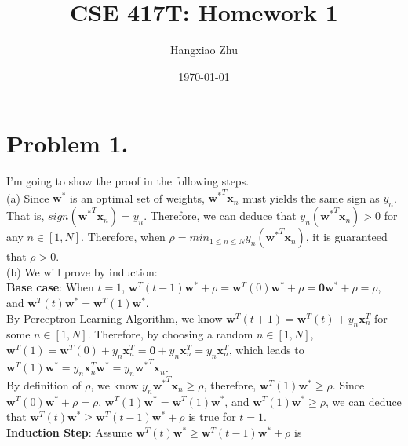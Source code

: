 \documentclass{article}
\begin{document}
    \onehalfspacing

    \begin{singlespace}
        \title{CSE 417T: Homework 1} 
        \author{Hangxiao Zhu}
        \date{\today}
        \maketitle
    \end{singlespace}

    \section*{Problem 1.}
    I'm going to show the proof in the following steps.\\
    (a) Since $\mathbf{w^*}$ is an optimal set of weights, $\mathbf{w^*}^T \mathbf{x}_n$ must yields the same
    sign as $y_n$. That is, $sign(\mathbf{w^*}^T \mathbf{x}_n) = y_n$. Therefore, we can deduce that 
    $y_n(\mathbf{w^*}^T \mathbf{x}_n) > 0$ for any $n \in [1, N]$. Therefore, when 
    $\rho = min_{1 \leq n \leq N}y_n(\mathbf{w^*}^T \mathbf{x}_n)$, it is guaranteed that $\rho > 0$.\\
    (b) We will prove by induction:\\
    \textbf{Base case}: When $t = 1$, $\mathbf{w}^T(t-1)\mathbf{w^*} + \rho = 
    \mathbf{w}^T(0)\mathbf{w^*} + \rho = \mathbf{0}\mathbf{w^*} + \rho = \rho$, and 
    $\mathbf{w}^T(t) \mathbf{w^*} = \mathbf{w}^T(1)\mathbf{w^*}$.\\
    By Perceptron Learning Algorithm, we know 
    $\mathbf{w}^T(t+1) = \mathbf{w}^T(t) + y_n\mathbf{x}_n^T$ for some $n \in [1, N]$.
    Therefore, by choosing a random $n \in [1, N]$, $\mathbf{w}^T(1) = \mathbf{w}^T(0) + y_n\mathbf{x}_n^T = 
    \mathbf{0} + y_n\mathbf{x}_n^T = y_n\mathbf{x}_n^T$, which leads to 
    $\mathbf{w}^T(1)\mathbf{w^*} = y_n\mathbf{x}_n^T \mathbf{w^*} = 
    y_n\mathbf{w^*}^T \mathbf{x}_n$.\\
    By definition of $\rho$, we know $y_n\mathbf{w^*}^T \mathbf{x}_n \geq \rho$, therefore, 
    $\mathbf{w}^T(1)\mathbf{w^*} \geq \rho$.
    Since $\mathbf{w}^T(0)\mathbf{w^*} + \rho = \rho$,
    $\mathbf{w}^T(1) \mathbf{w^*} = \mathbf{w}^T(1)\mathbf{w^*}$, and $\mathbf{w}^T(1)\mathbf{w^*} \geq \rho$,
    we can deduce that $\mathbf{w}^T(t)\mathbf{w^*} \geq \mathbf{w}^T(t-1)\mathbf{w^*} + \rho$ is true for 
    $t = 1$.\\
    \textbf{Induction Step}: Assume $\mathbf{w}^T(t)\mathbf{w^*} \geq \mathbf{w}^T(t-1)\mathbf{w^*} + \rho$ is 
\end{document}
